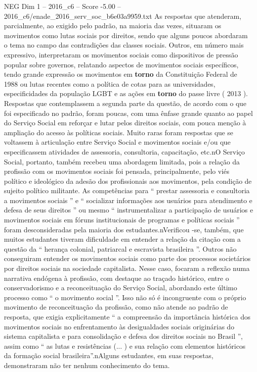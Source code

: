 \begin{textsample}{NEG Dim 1 – 2016\_c6 – Score -5.00 – 2016\_c6/enade\_2016\_serv\_soc\_b6e03a9959.txt}
As respostas que atenderam, parcialmente, ao exigido pelo padrão, na maioria das vezes, situaram os movimentos como lutas sociais por direitos, sendo que alguns poucos abordaram o tema no campo das contradições das classes sociais.
Outros, em número mais expressivo, interpretaram os movimentos sociais como dispositivos de pressão popular sobre governos, relatando aspectos de movimentos sociais específicos, tendo grande expressão os movimentos em \textbf{torno} da Constituição Federal de 1988 ou lutas recentes como a política de cotas para as universidades, especificidades da população LGBT e as ações em \textbf{torno} do passe livre ( 2013 ).
Respostas que contemplassem a segunda parte da questão, de acordo com o que foi especificado no padrão, foram poucas, com uma ênfase grande quanto ao papel do Serviço Social em reforçar e lutar pelos direitos sociais, com pouca menção à ampliação do acesso às políticas sociais.
Muito raras foram respostas que se voltassem à articulação entre Serviço Social e movimentos sociais e/ou que especificassem atividades de assessoria, consultoria, capacitação, etc.nO Serviço Social, portanto, também recebeu uma abordagem limitada, pois a relação da profissão com os movimentos sociais foi pensada, principalmente, pelo viés político e ideológico da adesão dos profissionais aos movimentos, pela condição de sujeito político militante.
As competências para “ prestar assessoria e consultoria a movimentos sociais ” e “ socializar informações aos usuários para atendimento e defesa de seus direitos ” ou mesmo “ instrumentalizar a participação de usuários e movimentos sociais em fóruns institucionais de programas e políticas sociais ” foram desconsideradas pela maioria dos estudantes.nVerificou -se, também, que muitos estudantes tiveram dificuldade em entender a relação da citação com a questão da “ herança colonial, patriarcal e escravista brasileira ”.
Outros não conseguiram entender os movimentos sociais como parte dos processos societários por direitos sociais na sociedade capitalista.
Nesse caso, focaram a reflexão numa narrativa endógena à profissão, com destaque ao traçado histórico, entre o conservadorismo e a reconceituação do Serviço Social, abordando este último processo como “ o movimento social ”.
Isso não só é incongruente com o próprio movimento de reconceituação da profissão, como não atende ao padrão de resposta, que exigia explicitamente “ a compreensão da importância histórica dos movimentos sociais no enfrentamento às desigualdades sociais originárias do sistema capitalista e para consolidação e defesa dos direitos sociais no Brasil ”, assim como “ as lutas e resistências (... ) e sua relação com elementos históricos da formação social brasileira”.nAlguns estudantes, em suas respostas, demonstraram não ter nenhum conhecimento do tema.

\end{textsample}

